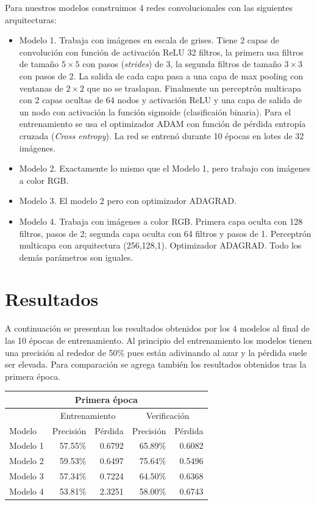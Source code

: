 \documentclass[spanish,11pt,letterpaper]{article}
\begin{document}
Para nuestros modelos construimos 4 redes convolucionales con las siguientes
arquitecturas:

\begin{itemize}
\item Modelo 1. Trabaja con imágenes en escala de grises. Tiene 2 capas de convolución
con función de activación ReLU  32 filtros, la primera usa filtros de tamaño
$5 \times 5$ con pasos (\textit{strides}) de 3, la segunda filtros de tamaño
$3 \times 3$ con pasos de 2. La salida de cada capa pasa a una capa de max pooling
con ventanas de $2 \times 2$ que no se traslapan. Finalmente un perceptrón multicapa
con 2 capas ocultas de 64 nodos y activación ReLU y una capa de salida de un nodo
con activación la función sigmoide (clasificaión binaria). Para el entrenamiento
se usa el optimizador ADAM con función de pérdida entropía cruzada (\textit{Cross entropy}).
La red se entrenó durante 10 épocas en lotes de 32 imágenes.
\item Modelo 2. Exactamente lo mismo que el Modelo 1, pero trabajo con imágenes
a color RGB.
\item Modelo 3. El modelo 2 pero con optimizador ADAGRAD.
\item Modelo 4. Trabaja con imágenes a color RGB. Primera capa oculta con 128
filtros, pasos de 2; segunda capa oculta con 64 filtros y pasos de 1. Perceptrón
multicapa con arquitectura (256,128,1). Optimizador ADAGRAD. Todo los demás
parámetros son iguales.
\end{itemize}

\section{Resultados}

A continuación se presentan los resultados obtenidos por los 4 modelos al final
de las 10 épocas de entrenamiento. Al principio del entrenamiento los modelos
tienen una precisión al rededor de 50\% pues están adivinando al azar y la pérdida
suele ser elevada. Para comparación se agrega también los resultados obtenidos
tras la primera época.

\begin{center}
\begin{tabular}{|l||r|r|r|r|}
\hline
\multicolumn{5}{|c|}{Primera época}
\\ \hline
& \multicolumn{2}{|c|}{Entrenamiento} & \multicolumn{2}{|c|}{Verificación}
\\ \hline
Modelo & Precisión & Pérdida & Precisión & Pérdida
\\ \hline
Modelo 1 & 57.55\% & 0.6792 & 65.89\% & 0.6082\\
Modelo 2 & 59.53\% & 0.6497 & 75.64\% & 0.5496\\
Modelo 3 & 57.34\% & 0.7224 & 64.50\% & 0.6368\\
Modelo 4 & 53.81\% & 2.3251 & 58.00\% & 0.6743\\
\hline
\end{tabular}
\end{center}
\end{document}
